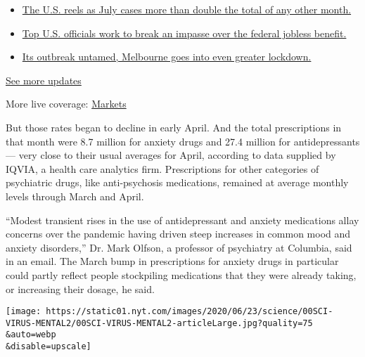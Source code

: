 \begin{itemize}
\tightlist
\item
  \href{https://www.nytimes.com/2020/08/01/world/coronavirus-covid-19.html?action=click\&pgtype=Article\&state=default\&region=MAIN_CONTENT_1\&context=storylines_live_updates\#link-34047410}{The
  U.S. reels as July cases more than double the total of any other
  month.}
\item
  \href{https://www.nytimes.com/2020/08/01/world/coronavirus-covid-19.html?action=click\&pgtype=Article\&state=default\&region=MAIN_CONTENT_1\&context=storylines_live_updates\#link-780ec966}{Top
  U.S. officials work to break an impasse over the federal jobless
  benefit.}
\item
  \href{https://www.nytimes.com/2020/08/01/world/coronavirus-covid-19.html?action=click\&pgtype=Article\&state=default\&region=MAIN_CONTENT_1\&context=storylines_live_updates\#link-2bc8948}{Its
  outbreak untamed, Melbourne goes into even greater lockdown.}
\end{itemize}

\href{https://www.nytimes.com/2020/08/01/world/coronavirus-covid-19.html?action=click\&pgtype=Article\&state=default\&region=MAIN_CONTENT_1\&context=storylines_live_updates}{See
more updates}

More live coverage:
\href{https://www.nytimes.com/live/2020/07/31/business/stock-market-today-coronavirus?action=click\&pgtype=Article\&state=default\&region=MAIN_CONTENT_1\&context=storylines_live_updates}{Markets}

But those rates began to decline in early April. And the total
prescriptions in that month were 8.7 million for anxiety drugs and 27.4
million for antidepressants --- very close to their usual averages for
April, according to data supplied by IQVIA, a health care analytics
firm. Prescriptions for other categories of psychiatric drugs, like
anti-psychosis medications, remained at average monthly levels through
March and April.

``Modest transient rises in the use of antidepressant and anxiety
medications allay concerns over the pandemic having driven steep
increases in common mood and anxiety disorders,'' Dr. Mark Olfson, a
professor of psychiatry at Columbia, said in an email. The March bump in
prescriptions for anxiety drugs in particular could partly reflect
people stockpiling medications that they were already taking, or
increasing their dosage, he said.

\texttt{[image: https://static01.nyt.com/images/2020/06/23/science/00SCI-VIRUS-MENTAL2/00SCI-VIRUS-MENTAL2-articleLarge.jpg?quality=75\\\&auto=webp\\\&disable=upscale]}

